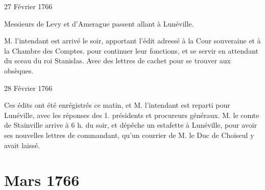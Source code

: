                      \begin{diary}{27 Février 1766}{}


                           Messieurs
                           de Levy et d'Amerague passent allant
                           à Lunéville. \bigskip



                           M. l'intendant est arrivé le
                           soir, apportant
                           l'édit adressé à la Cour souveraine et à la Chambre des Comptes.
                           pour continuer leur fonctions, et se servir en
                           attendant du sceau du roi
                              Stanislas. Avec des
                           lettres de cachet pour se
                           trouver aux obsèques. \bigskip


                     \end{diary}
                     \begin{diary}{28 Février 1766}{}

                         Ces édits ont été enrégistrés ce
                           matin, et M.
                              l'intendant est reparti pour Lunéville, avec les
                           réponses des 1. présidents et procureurs généraux.
                           M. le comte de Stainville
                           arrive à 6 h. du
                           soir, et dépêche un estafette à Lunéville, pour
                           avoir ses nouvelles lettres de commandant, qu'un
                           courrier de M. le Duc de
                              Choiseul y avait
                           laissé. \bigskip


                     \end{diary}
                  \chapter*{Mars 1766}


